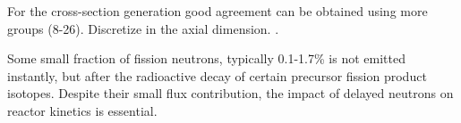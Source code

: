 \documentclass[11pt,letterpaper]{article}
\begin{document}
For the cross-section generation good agreement can be obtained using more groups (8-26).
Discretize in the axial dimension.
\cite{gougar_high_2019}.


Some small fraction of fission neutrons, typically 0.1-1.7\% is not emitted instantly, but after the radioactive decay of certain precursor fission product isotopes.
Despite their small flux contribution, the impact of delayed neutrons on reactor kinetics is essential.


\cite{leppanen_development_2007}





\pagebreak


\end{document}
